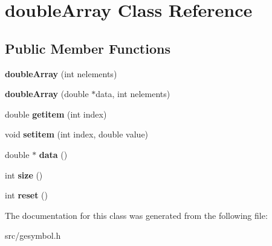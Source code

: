 \hypertarget{classdouble_array}{\section{double\-Array Class Reference}
\label{classdouble_array}
}
\subsection*{Public Member Functions}
\begin{DoxyCompactItemize}
\item 
\hypertarget{classdouble_array_aa40eb5b0c0018edca62079e9507a5fa0}{{\bfseries double\-Array} (int nelements)}\label{classdouble_array_aa40eb5b0c0018edca62079e9507a5fa0}

\item 
\hypertarget{classdouble_array_a18879df91e103b27f5359c5db6b2a78b}{{\bfseries double\-Array} (double $\ast$data, int nelements)}\label{classdouble_array_a18879df91e103b27f5359c5db6b2a78b}

\item 
\hypertarget{classdouble_array_a4a1cc96d05dc346d9017f29cf41f1def}{double {\bfseries getitem} (int index)}\label{classdouble_array_a4a1cc96d05dc346d9017f29cf41f1def}

\item 
\hypertarget{classdouble_array_a6feb7610fffe884308bac4a73ba64a27}{void {\bfseries setitem} (int index, double value)}\label{classdouble_array_a6feb7610fffe884308bac4a73ba64a27}

\item 
\hypertarget{classdouble_array_a758781789df7ca1b6dcaf8ee6866faf6}{double $\ast$ {\bfseries data} ()}\label{classdouble_array_a758781789df7ca1b6dcaf8ee6866faf6}

\item 
\hypertarget{classdouble_array_a0ac48fa266b19b1344e48497239b0b40}{int {\bfseries size} ()}\label{classdouble_array_a0ac48fa266b19b1344e48497239b0b40}

\item 
\hypertarget{classdouble_array_af81f996526a8815c3bcebf53567ec4e8}{int {\bfseries reset} ()}\label{classdouble_array_af81f996526a8815c3bcebf53567ec4e8}

\end{DoxyCompactItemize}


The documentation for this class was generated from the following file\-:\begin{DoxyCompactItemize}
\item 
src/gesymbol.\-h\end{DoxyCompactItemize}
